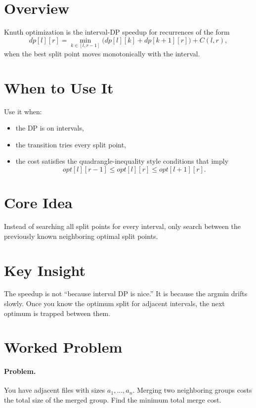\section*{Overview}

Knuth optimization is the interval-DP speedup for recurrences of the form
\[
dp[l][r] = \min_{k \in [l, r-1]} \bigl(dp[l][k] + dp[k+1][r]\bigr) + C(l, r),
\]
when the best split point moves monotonically with the interval.

\section*{When to Use It}

Use it when:

\begin{itemize}
  \item the DP is on intervals,
  \item the transition tries every split point,
  \item the cost satisfies the quadrangle-inequality style conditions that imply
  \[
  opt[l][r-1] \le opt[l][r] \le opt[l+1][r].
  \]
\end{itemize}

\section*{Core Idea}

Instead of searching all split points for every interval, only search between the previously known neighboring optimal
split points.

\section*{Key Insight}

The speedup is not ``because interval DP is nice.'' It is because the argmin drifts slowly. Once you know the optimum
split for adjacent intervals, the next optimum is trapped between them.

\section*{Worked Problem}

\paragraph{Problem.}
You have adjacent files with sizes \(a_1, \dots, a_n\). Merging two neighboring groups costs the total size of the
merged group. Find the minimum total merge cost.

